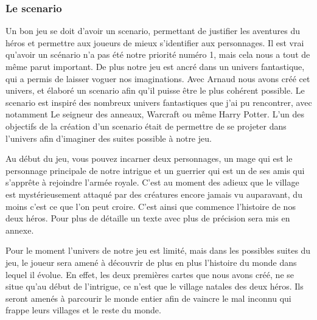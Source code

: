 \documentclass[a4paper, 12pt]{article}
\begin{document}
		\subsubsection{Le scenario}
		Un bon jeu se doit d’avoir un scenario, permettant de justifier les aventures du héros et permettre aux joueurs de mieux s’identifier aux personnages. Il est vrai qu’avoir un scénario n’a pas été notre priorité numéro 1, mais cela nous a tout de même parut important. De plus notre jeu est ancré dans un univers fantastique, qui a permis de laisser voguer nos imaginations. Avec Arnaud nous avons créé cet univers, et élaboré un scenario afin qu’il puisse être le plus cohérent possible. Le scenario est inspiré des nombreux univers fantastiques que j’ai pu rencontrer, avec notamment Le seigneur des anneaux, Warcraft ou même Harry Potter. L’un des objectifs de la création d’un scenario était de permettre de se projeter dans l’univers afin d’imaginer des suites possible à notre jeu.
\par Au début du jeu, vous pouvez incarner deux personnages, un mage qui est le personnage principale de notre intrigue et un guerrier qui est un de ses amis qui s’apprête à rejoindre l’armée royale. C’est au moment des adieux que le village est mystérieusement  attaqué par des créatures encore jamais vu auparavant, du moins c’est ce que l’on peut croire. C’est ainsi que commence l’histoire de nos deux héros. Pour plus de détaille un texte avec plus de précision sera mis en annexe.
\par Pour le moment l’univers de notre jeu est limité, mais dans les possibles suites du jeu, le joueur sera amené à découvrir de plus en plus l’histoire du monde dans lequel il évolue. En effet, les deux premières cartes que nous avons créé, ne se situe qu’au début de l’intrigue, ce n’est que le village natales des deux héros. Ils seront amenés à parcourir le monde entier afin de vaincre le mal inconnu qui frappe leurs villages et le reste du monde.
\end{document}
